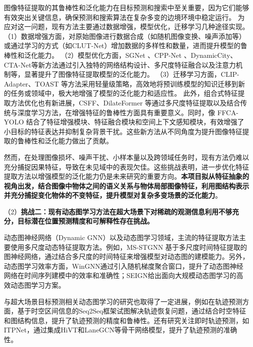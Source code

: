 图像特征提取的其鲁棒性和泛化能力在目标预测和搜索中至关重要，因为它们能够有效突出关键信息，确保预测和搜索算法在复杂多变的边境环境中稳定运行。
为应对这一问题，现有方法主要通过数据增强，模型优化，迁移学习几种途径实现。
（1）数据增强方面，对原始图像进行数据合成（如随机图像变换\cite{cubuk2020randaugment}、噪声添加\cite{chowdhury2025r}等）或通过学习的方式（如CLUT-Net\cite{mei2022clut}）增加数据的多样性和数量，进而提升模型的鲁棒性和泛化能力。
（2）模型优化方面，SGNet \cite{liu2021sg}、CPP-Net \cite{guo2024cpp} 、DynamicCity\cite{dynamiccity2025}、CTA-Net\cite{Meng2024CTA-Net}等新方法通过引入独特的网络结构设计、多尺度特征融合以及注意力机制等，显著提升了图像特征提取模型的泛化能力。
（3）迁移学习方面，CLIP-Adapter\cite{gao2021clip}、TOAST\cite{shi2023toast} 等方法采用轻量级策略，高效地将预训练模型的知识迁移到新的任务或领域中，极大地增强了模型的泛化能力和适应性。
此外，组合式特征提取方法优化也有新进展，CSFF\cite{cheng2020cross}、DilateFormer\cite{jiao2023dilateformer} 等通过多尺度特征提取以及结合传统与深度学习方法，在增强特征的鲁棒性方面具有重要意义。同时，像 FFCA-YOLO \cite{yin2024ffca} 结合了特征增强模块、特征融合模块和空间上下文感知模块，有效增强了小目标的特征表达并抑制复杂背景干扰。这些新方法从不同角度为提升图像特征提取的鲁棒性和泛化能力做出了贡献。

然而，在处理图像损坏、噪声干扰、小样本量以及跨领域任务时，现有方法仍难以充分捕捉因果特征，导致在未见域中的表现欠佳。这些挑战表明，进一步优化特征提取方法以增强模型的泛化能力仍是未来研究的重要方向。\textbf{本项目拟从特征抽象的视角出发，结合图像中物体之间的语义关系与物体局部图像特征，利用图结构表示并充分捕捉变化物体的不变特征，提升模型对复杂多变场景的泛化能力}。

（2）\textbf{挑战二：现有动态图学习方法在超大场景下对稀疏的观测信息利用不够充分，目标潜在位置预测精度和可解释性存在挑战。}

动态图神经网络（Dynamic GNN）以及动态图学习领域，主流的特征提取方法主要使用多尺度动态特征提取方法。例如，MS-STGNN \cite{wang2023multi}基于多尺度时间特征提取的图神经网络，通过结合多尺度的时间特征来增强模型对动态图的建模能力。另外，动态图学习效率方面，WinGNN\cite{zhu2023wingnn}通过引入随机梯度聚合窗口，提升了动态图神经网络在时间序列建模中的效率和准确性；SEIGN给出面向大规模动态图学习的高效动态图学习方案。

与超大场景目标预测相关动态图学习的研究也取得了一定进展，例如在轨迹预测方面，基于时空区间信息的Seq2Seq\cite{Seq2SeqTrajRec}框架试图解决轨迹恢复问题，通过结合时空特征和图结构信息，提升了轨迹预测的精度和鲁棒性。还有研究关注即时轨迹预测，如ITPNet\cite{ITPNet}，通过集成HiVT\cite{zhou2022hivt}和LaneGCN\cite{liang2020learning}等骨干网络模型，提升了轨迹预测的准确性。

